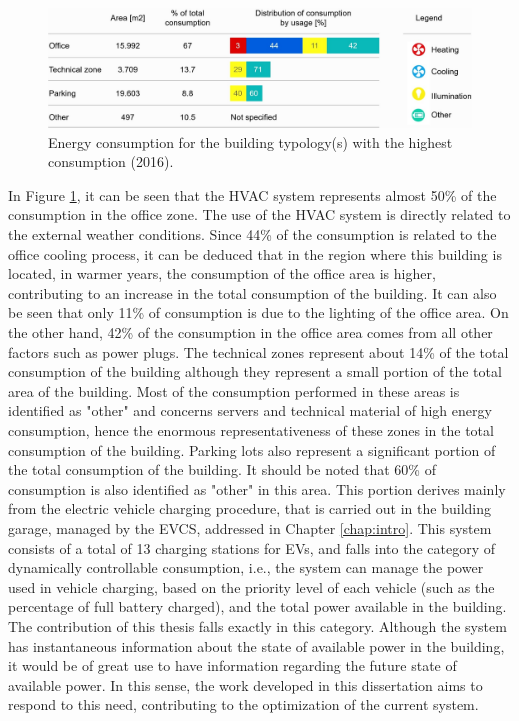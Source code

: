 \begin{figure}[h!]
    \centering
    \begin{center}
    \includegraphics[width=1\textwidth]{Images/ConsumoEDP.jpeg}
    \caption{Energy consumption for the building typology(s) with the highest consumption (2016).}
    \label{consedp}
    \end{center}
\end{figure}
In Figure \ref{consedp}, it can be seen that the \ac{HVAC} system represents almost 50\% of the consumption in the office zone. The use of the \ac{HVAC} system is directly related to the external weather conditions. Since 44\% of the consumption is related to the office cooling process, it can be deduced that in the region where this building is located, in warmer years, the consumption of the office area is higher, contributing to an increase in the total consumption of the building. It can also be seen that only 11\% of consumption is due to the lighting of the office area. On the other hand, 42\% of the consumption in the office area comes from all other factors such as power plugs. The technical zones represent about 14\% of the total consumption of the building although they represent a small portion of the total area of the building. Most of the consumption performed in these areas is identified as "other" and concerns servers and technical material of high energy consumption, hence the enormous representativeness of these zones in the total consumption of the building. Parking lots also represent a significant portion of the total consumption of the building. It should be noted that 60\% of consumption is also identified as "other" in this area. This portion derives mainly from the electric vehicle charging procedure, that is carried out in the building garage, managed by the \ac{EVCS}, addressed in Chapter \ref{chap:intro}. This system consists of a total of 13 charging stations for \ac{EV}s, and falls into the category of dynamically controllable consumption, i.e., the system can manage the power used in vehicle charging, based on the priority level of each vehicle (such as the percentage of full battery charged), and the total power available in the building. The contribution of this thesis falls exactly in this category. Although the system has instantaneous information about the state of available power in the building, it would be of great use to have information regarding the future state of available power. In this sense, the work developed in this dissertation aims to respond to this need, contributing to the optimization of the current system.

